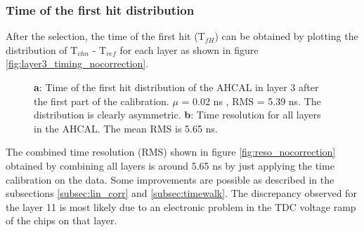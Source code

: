 \documentclass[twoside,a4paper,11pt]{article}
\begin{document}
\subsubsection{Time of the first hit distribution}
After the selection, the time of the first hit (T$_{fH}$) can be obtained by plotting the distribution of T$_{chn}$ - T$_{ref}$ for each layer as shown in figure \ref{fig:layer3_timing_nocorrection}.
\begin{figure}[htbp]
	\hfill
	\hfill
\caption[]{\textbf{a}: Time of the first hit distribution of the AHCAL in layer 3 after the first part of the calibration. $\mu$ = 0.02 ns , RMS = 5.39 ns. The distribution is clearly asymmetric. \textbf{b}: Time resolution for all layers in the AHCAL. The mean RMS is 5.65 ns.}
\end{figure}
The combined time resolution (RMS) shown in figure \ref{fig:reso_nocorrection} obtained by combining all layers is around 5.65 ns by just applying the time calibration on the data. Some improvements are possible as described in the subsections \ref{subsec:lin_corr} and \ref{subsec:timewalk}. The discrepancy observed for the layer 11 is most likely due to an electronic problem in the TDC voltage ramp of the chips on that layer.
\end{document}

